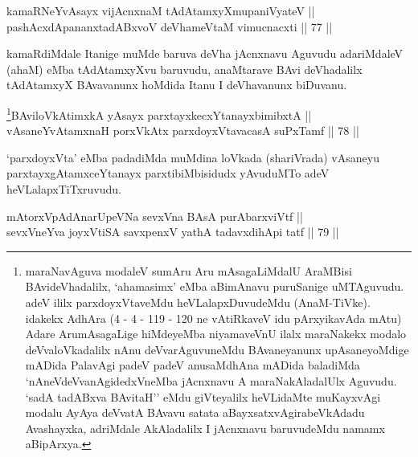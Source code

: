 
\begin{shl}
kamaRNeYvAsayx vijAcnxnaM tAdAtamxyXmupaniVyateV || \\
pashAcxdApananxtadABxvoV deVhameVtaM vimucnacxti \hfill || 77 ||  
\end{shl}

\begin{artha}
kamaRdiMdale Itanige muMde baruva deVha jAcnxnavu Aguvudu adariMdaleV
(ahaM) eMba tAdAtamxyXvu baruvudu, anaMtarave BAvi deVhadalilx tAdAtamxyX
BAvavanunx hoMdida Itanu I deVhavanunx biDuvanu.
\end{artha}



\begin{shl}
\footnote{maraNavAguva modaleV sumAru Aru mAsagaLiMdalU AraMBisi
BAvideVhadalilx, `ahamasimx' eMba aBimAnavu puruSanige uMTAguvudu.
adeV ililx parxdoyxVtaveMdu heVLalapxDuvudeMdu (AnaM-TiVke). idakekx
AdhAra (4 - 4 - 119 - 120 ne vAtiRkaveV idu pArxyikavAda mAtu) Adare
ArumAsagaLige hiMdeyeMba niyamaveVnU ilalx maraNakekx modalo
deVvaloVkadalilx nAnu deVvarAguvuneMdu BAvaneyanunx upAsaneyoMdige
mADida PalavAgi padeV padeV anusaMdhAna mADida baladiMda
`nAneVdeVvanAgidedxVneMba jAcnxnavu A maraNakAladalUlx Aguvudu. `sadA tadABxva BAvitaH'' eMdu giVteyalilx heVLidaMte muKayxvAgi modalu AyAya deVvatA BAvavu satata aBayxsatxvAgirabeVkAdadu Avashayxka, adriMdale
AkAladalilx I jAcnxnavu baruvudeMdu namamx aBipArxya.}BAviloVkAtimxkA yA\s sayx parxtayxkecxYtanayxbimibxtA || \\
vAsaneYvA\s \s tamxnaH porxVkAtx parxdoyxVtavacasA suPxTamf \hfill || 78 ||  
\end{shl}

\begin{artha}
`parxdoyxVta' eMba padadiMda muMdina loVkada (shariVrada) vAsaneyu
parxtayxgAtamxceYtanayx parxtibiMbisidudx yAvuduMTo adeV heVLalapxTiTxruvudu.
\end{artha}


\begin{shl}
mAtorxVpAdAnarUpeVNa sevxVna BAsA purA\s barxviVtf || \\
sevxVneYva joyxVtiSA savxpenxV yathA tadavxdihApi tatf \hfill || 79 || 
\end{shl}

